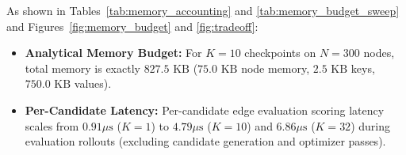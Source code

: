\documentclass[10pt,twocolumn,letterpaper]{article}
\begin{document}
\begin{table}[!htbp]
\centering
\small
\caption{\textbf{Model Memory Footprint and Parameter Accounting ($N=300, d_m=64$).}}
\label{tab:memory_accounting}
\end{table}

\begin{table}[!htbp]
\centering
\small
\caption{\textbf{Episodic Memory Budget Sweep ($K \in \{1, \dots, 32\}$, $T_B=100$).}}
\label{tab:memory_budget_sweep}
\end{table}

As shown in Tables~\ref{tab:memory_accounting} and \ref{tab:memory_budget_sweep} and Figures~\ref{fig:memory_budget} and \ref{fig:tradeoff}:
\begin{itemize}
    \item \textbf{Analytical Memory Budget:} For $K=10$ checkpoints on $N=300$ nodes, total memory is exactly $827.5\text{ KB}$ ($75.0\text{ KB}$ node memory, $2.5\text{ KB}$ keys, $750.0\text{ KB}$ values).
    \item \textbf{Per-Candidate Latency:} Per-candidate edge evaluation scoring latency scales from $0.91\mu\text{s}$ ($K=1$) to $4.79\mu\text{s}$ ($K=10$) and $6.86\mu\text{s}$ ($K=32$) during evaluation rollouts (excluding candidate generation and optimizer passes).
\end{itemize}
\end{document}
